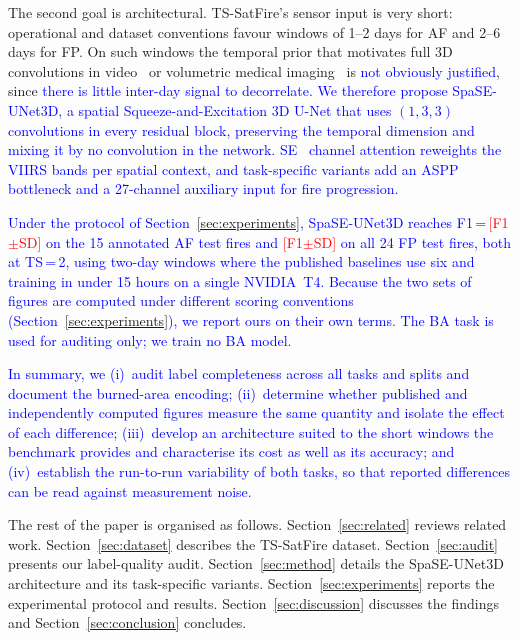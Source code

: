 \documentclass[sensors,article,submit,moreauthors,pdftex]{Definitions/mdpi}
\newcommand{\rev}[1]{\textcolor{blue}{#1}}
\newcommand{\afTStwo}{\textcolor{red}{[F1$\pm$SD]}}
\newcommand{\fpAll}{\textcolor{red}{[F1$\pm$SD]}}
\begin{document}
The second goal is architectural. TS-SatFire's sensor input is very short:
operational and dataset conventions favour windows of 1--2 days for AF and
2--6 days for FP. On such windows the temporal prior that motivates full 3D
convolutions in video~\cite{tran2018closer,qiu2017learning} or volumetric
medical imaging~\cite{cciccek20163d} is \rev{not obviously justified}, since
\rev{there is little inter-day signal to decorrelate. We therefore propose
SpaSE-UNet3D, a spatial Squeeze-and-Excitation 3D U-Net that uses $(1,3,3)$
convolutions in every residual block, preserving the temporal dimension and
mixing it by no convolution in the network. SE~\cite{hu2018squeeze} channel
attention reweights the VIIRS bands per spatial context, and task-specific
variants add an ASPP~\cite{chen2017rethinking,chen2018encoder} bottleneck and a
27-channel auxiliary input for fire progression.}

\rev{Under the protocol of Section~\ref{sec:experiments}, SpaSE-UNet3D reaches
F1\,=\,\afTStwo{} on the 15 annotated AF test fires and \fpAll{} on all 24 FP
test fires, both at TS\,=\,2, using two-day windows where the published
baselines use six and training in under 15 hours on a single NVIDIA~T4. Because
the two sets of figures are computed under different scoring conventions
(Section~\ref{sec:experiments}), we report ours on their own terms. The BA task
is used for auditing only; we train no BA model.}

\rev{In summary, we (i)~audit label completeness across all tasks and splits and
document the burned-area encoding; (ii)~determine whether published and
independently computed figures measure the same quantity and isolate the effect
of each difference; (iii)~develop an architecture suited to the short windows the
benchmark provides and characterise its cost as well as its accuracy; and
(iv)~establish the run-to-run variability of both tasks, so that reported
differences can be read against measurement noise.}

The rest of the paper is organised as follows.
Section~\ref{sec:related} reviews related work.
Section~\ref{sec:dataset} describes the TS-SatFire dataset.
Section~\ref{sec:audit} presents our label-quality audit.
Section~\ref{sec:method} details the SpaSE-UNet3D architecture
and its task-specific variants.
Section~\ref{sec:experiments} reports the experimental protocol
and results.
Section~\ref{sec:discussion} discusses the findings and
Section~\ref{sec:conclusion} concludes.

\end{document}
